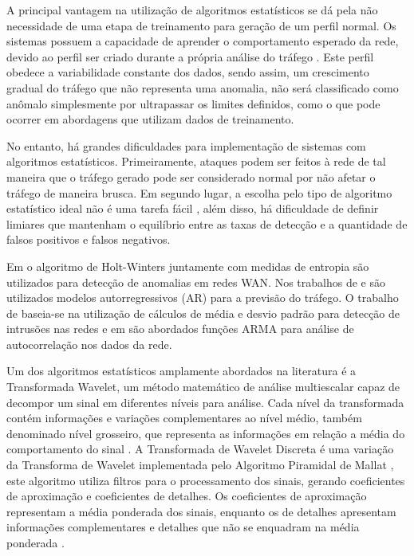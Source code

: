 \indent A principal vantagem na utilização de algoritmos estatísticos se dá pela não necessidade de uma etapa de treinamento para geração de um perfil normal. Os sistemas possuem a capacidade de aprender o comportamento esperado da rede, devido ao perfil ser criado durante a própria análise do tráfego \cite{Teodoro2009}. Este perfil obedece a variabilidade constante dos dados, sendo assim, um crescimento gradual do tráfego que não representa uma anomalia, não será classificado como anômalo simplesmente por ultrapassar os limites definidos, como o que pode ocorrer em abordagens que utilizam dados de treinamento.

\indent No entanto, há grandes dificuldades para implementação de sistemas com algoritmos estatísticos. Primeiramente, ataques podem ser feitos à rede de tal maneira que o tráfego gerado pode ser considerado normal por não afetar o tráfego de maneira brusca. Em segundo lugar, a escolha pelo tipo de algoritmo estatístico ideal não é uma tarefa fácil \cite{Bhuyan}, além disso, há dificuldade de definir limiares que mantenham o equilíbrio entre as taxas de detecção e a quantidade de falsos positivos e falsos negativos.

\indent Em  o algoritmo de Holt-Winters juntamente com medidas de entropia são utilizados para detecção de anomalias em redes WAN. Nos trabalhos de  e  são utilizados modelos autorregressivos (AR) para a previsão do tráfego. O trabalho de  baseia-se na utilização de cálculos de média e desvio padrão para detecção de intrusões nas redes e em  são abordados funções ARMA para análise de autocorrelação nos dados da rede.

\indent Um dos algoritmos estatísticos amplamente abordados na literatura é a Transformada Wavelet, um método matemático de análise multiescalar capaz de decompor um sinal em diferentes níveis para análise. Cada nível da transformada contém informações e variações complementares ao nível médio, também denominado nível grosseiro, que representa as informações em relação a média do comportamento do sinal \cite{perlin2011}. A Transformada de Wavelet Discreta é uma variação da Transforma de Wavelet implementada pelo Algoritmo Piramidal de Mallat \cite{mallat1998}, este algoritmo utiliza filtros para o processamento dos sinais, gerando coeficientes de aproximação e coeficientes de detalhes. Os coeficientes de aproximação representam a média ponderada dos sinais, enquanto os de detalhes apresentam informações complementares e detalhes que não se enquadram na média ponderada \cite{Righi2014}.

